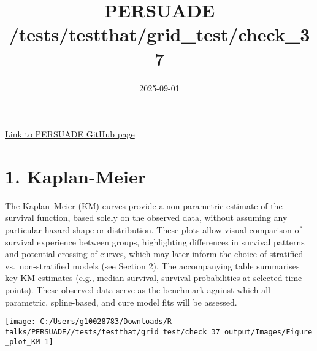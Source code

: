 \documentclass[
]{article}
\title{PERSUADE /tests/testthat/grid\_test/check\_37}
\author{}
\date{\vspace{-2.5em}2025-09-01}
\begin{document}
\maketitle

{
\hypersetup{linkcolor=}
\setcounter{tocdepth}{2}
\tableofcontents
}
\hfill\break

\href{https://github.com/Bram-R/PERSUADE}{Link to PERSUADE GitHub page}

\clearpage

\section{1. Kaplan-Meier}\label{kaplan-meier}

The Kaplan--Meier (KM) curves provide a non-parametric estimate of the
survival function, based solely on the observed data, without assuming
any particular hazard shape or distribution. These plots allow visual
comparison of survival experience between groups, highlighting
differences in survival patterns and potential crossing of curves, which
may later inform the choice of stratified vs.~non-stratified models (see
Section 2). The accompanying table summarises key KM estimates (e.g.,
median survival, survival probabilities at selected time points). These
observed data serve as the benchmark against which all parametric,
spline-based, and cure model fits will be assessed.

\clearpage

\begin{flushleft}\texttt{[image: C:/Users/g10028783/Downloads/R talks/PERSUADE//tests/testthat/grid\_test/check\_37\_output/Images/Figure\_plot\_KM-1]} \end{flushleft}

\begin{table}[H]
\centering
\caption{\label{tab:Table_1}Observed survival data}
\centering
{}
\end{table}
\end{document}
